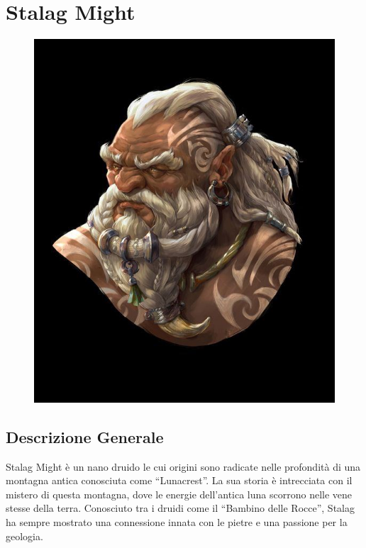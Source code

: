 \section{Stalag Might}\label{stalag-might}


\begin{figure}
\centering
\includegraphics{2023-09-17_22.34.48.jpg}
\end{figure}

\subsection{Descrizione Generale}\label{descrizione-generale}


Stalag Might è un nano druido le cui origini sono radicate nelle
profondità di una montagna antica conosciuta come ``Lunacrest''. La sua
storia è intrecciata con il mistero di questa montagna, dove le energie
dell'antica luna scorrono nelle vene stesse della terra. Conosciuto tra
i druidi come il ``Bambino delle Rocce'', Stalag ha sempre mostrato una
connessione innata con le pietre e una passione per la geologia.

